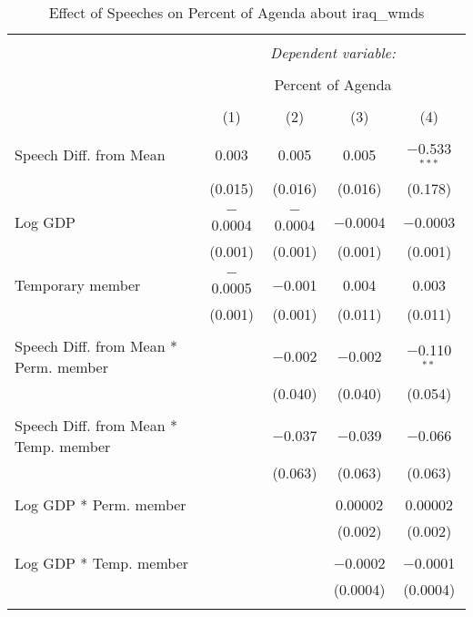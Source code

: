 
\begin{table}[!htbp] \centering 
  \caption{Effect of Speeches on Percent of Agenda about iraq_wmds} 
  \label{} 
\begin{tabular}{@{\extracolsep{5pt}}lcccc} 
\\[-1.8ex]\hline 
\hline \\[-1.8ex] 
 & \multicolumn{4}{c}{\textit{Dependent variable:}} \\ 
\cline{2-5} 
\\[-1.8ex] & \multicolumn{4}{c}{Percent of Agenda} \\ 
\\[-1.8ex] & (1) & (2) & (3) & (4)\\ 
\hline \\[-1.8ex] 
 Speech Diff. from Mean & 0.003 & 0.005 & 0.005 & $-$0.533$^{***}$ \\ 
  & (0.015) & (0.016) & (0.016) & (0.178) \\ 
  & & & & \\ 
 Log GDP & $-$0.0004 & $-$0.0004 & $-$0.0004 & $-$0.0003 \\ 
  & (0.001) & (0.001) & (0.001) & (0.001) \\ 
  & & & & \\ 
 Temporary member & $-$0.0005 & $-$0.001 & 0.004 & 0.003 \\ 
  & (0.001) & (0.001) & (0.011) & (0.011) \\ 
  & & & & \\ 
 Speech Diff. from Mean * Perm. member &  & $-$0.002 & $-$0.002 & $-$0.110$^{**}$ \\ 
  &  & (0.040) & (0.040) & (0.054) \\ 
  & & & & \\ 
 Speech Diff. from Mean * Temp. member &  & $-$0.037 & $-$0.039 & $-$0.066 \\ 
  &  & (0.063) & (0.063) & (0.063) \\ 
  & & & & \\ 
 Log GDP * Perm. member &  &  & 0.00002 & 0.00002 \\ 
  &  &  & (0.002) & (0.002) \\ 
  & & & & \\ 
 Log GDP * Temp. member &  &  & $-$0.0002 & $-$0.0001 \\ 
  &  &  & (0.0004) & (0.0004) \\ 
  & & & & \\ 

\end{tabular}
\end{table}
